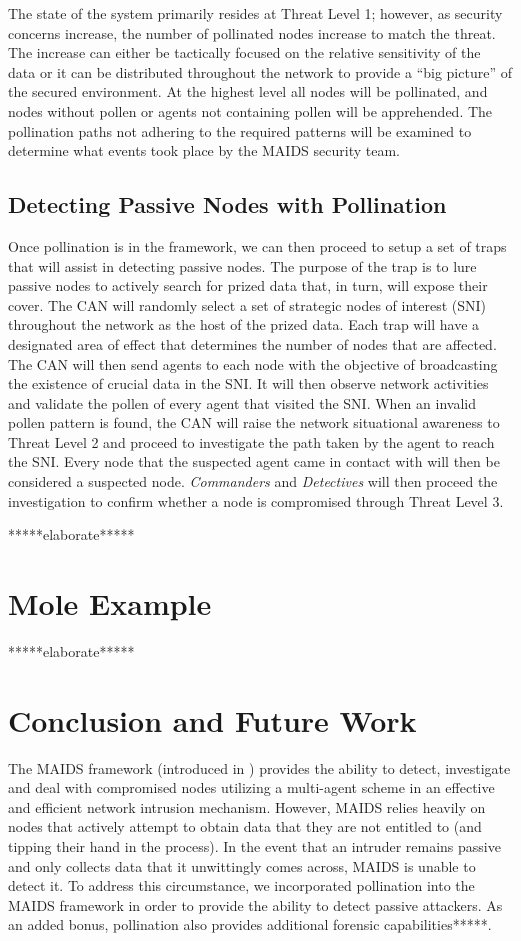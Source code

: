 \documentclass{acm_proc_article-sp}
\begin{document}
The state of the system primarily resides at Threat Level 1; however, as security concerns increase, the number of pollinated nodes increase to match the threat.  The increase can either be tactically focused on the relative sensitivity of the data or it can be distributed throughout the network to provide a ``big picture'' of the secured environment.  At the highest level all nodes will be pollinated, and nodes without pollen or agents not containing pollen will be apprehended.  The pollination paths not adhering to the required patterns will be examined to determine what events took place by the MAIDS security team.

\subsection{Detecting Passive Nodes with Pollination}
Once pollination is in the framework, we can then proceed to setup a set of traps that will assist in detecting passive nodes.  The purpose of the trap is to lure passive nodes to actively search for prized data that, in turn, will expose their cover.  The CAN will randomly select a set of strategic nodes of interest (SNI) throughout the network as the host of the prized data.  Each trap will have a designated area of effect that determines the number of nodes that are affected.  The CAN will then send agents to each node with the objective of broadcasting the existence of crucial data in the SNI.  It will then observe network activities and validate the pollen of every agent that visited the SNI.  When an invalid pollen pattern is found, the CAN will raise the network situational awareness to Threat Level 2 and proceed to investigate the path taken by the agent to reach the SNI.  Every node that the suspected agent came in contact with will then be considered a suspected node.  {\it Commanders} and {\it Detectives} will then proceed the investigation to confirm whether a node is compromised through Threat Level 3.

*****elaborate*****

\section{Mole Example}
*****elaborate*****

\section{Conclusion and Future Work}
The MAIDS framework (introduced in \cite{kackley09}) provides the ability to detect, investigate and deal with compromised nodes utilizing a multi-agent scheme in an effective and efficient network intrusion mechanism.  However, MAIDS relies heavily on nodes that actively attempt to obtain data that they are not entitled to (and tipping their hand in the process).  In the event that an intruder remains passive and only collects data that it unwittingly comes across, MAIDS is unable to detect it.  To address this circumstance, we incorporated pollination into the MAIDS framework in order to provide the ability to detect passive attackers.  As an added bonus, pollination also provides additional forensic capabilities*****.
\end{document}
